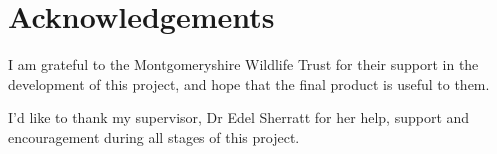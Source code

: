 \thispagestyle{empty}


\section*{\centering Acknowledgements}


I am grateful to the Montgomeryshire Wildlife Trust for their support in the development of this project, and hope that the final product is useful to them.

I'd like to thank my supervisor, Dr Edel Sherratt for her help, support and encouragement during all stages of this project.

